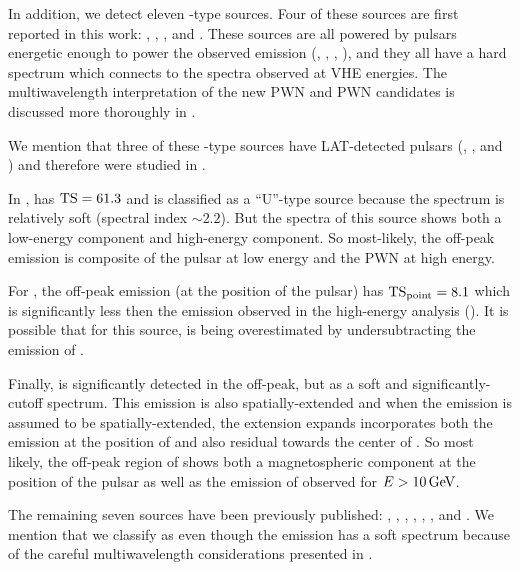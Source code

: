 In addition, we detect eleven \PWNcClass-type sources.  Four of these
sources are first reported in this work: , ,
, and .  These sources are all powered by
pulsars energetic enough to power the observed emission (,
, , ), and they all have a hard
spectrum which connects to the spectra observed at \ac{VHE} energies.  The
multiwavelength interpretation of the new \ac{PWN} and \ac{PWN} candidates
is discussed more thoroughly in \cite{acero_2013a_constraints-galactic}.

We mention that three of these \PWNcClass-type sources have \ac{LAT}-detected
pulsars (, , and ) and therefore were
studied in .

In ,  has $\mathrm{TS}=61.3$ and is classified as a
``U''-type source because the spectrum is relatively soft (spectral index
$\sim2.2$).  But the spectra of this source shows both a low-energy
component and high-energy component.  So most-likely, the off-peak
emission is composite of the pulsar at low energy and the \ac{PWN}
at high energy.

For , the off-peak emission (at the position of the pulsar)
has $\mathrm{TS}_\mathrm{point}=8.1$ which is significantly less then the emission observed
in the high-energy analysis ().  It is possible that for this
source, \tstev is being overestimated by undersubtracting the emission
of .

Finally,  is significantly detected in the off-peak,
but as a soft and significantly-cutoff spectrum. This emission
is also spatially-extended and when the emission is assumed to be
spatially-extended, the extension expands incorporates both the emission
at the position of  and also residual towards the center of
. So most likely, the off-peak region of  shows
both a magnetospheric component at the position of the pulsar as well
as the emission of  observed for $E>10\,\text{GeV}$.

The remaining seven sources have been previously published:
 \citep{ackermann_2011a_fermi-lat-search},
 \citep{slane_2010a_fermi-detection}, 
\citep{lande_2012_search-spatially}, 
\citep{lande_2012_search-spatially}, 
\citep{lande_2012_search-spatially}, 
\citep{tam_2010a_search-counterparts}, and 
\citep{rousseau_2012a_fermi-lat-constraints}.  We mention that we
classify  as \PWNcClass even though the \gev emission has
a soft spectrum because of the careful multiwavelength considerations
presented in \cite{lemoine-goumard_2011a_fermi-lat-detection}.

